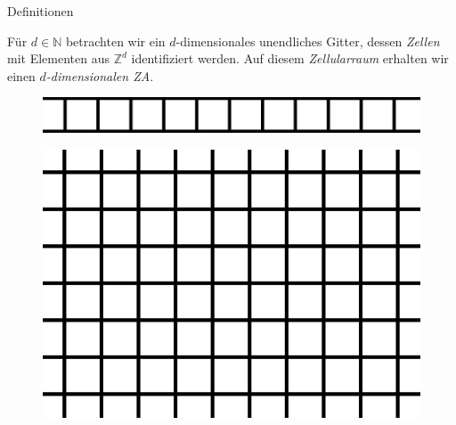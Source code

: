 \documentclass[aspectratio=169]{beamer}
\begin{document}
  \begin{frame}{Definitionen}
    \begin{definition*}[Zellularraum]
      Für $d \in \mathbb{N}$ betrachten wir ein $d$-dimensionales unendliches Gitter, dessen \textit{Zellen} mit Elementen aus $\mathbb{Z}^d$ identifiziert werden. Auf diesem \textit{Zellularraum} erhalten wir einen \textit{$d$-dimensionalen ZA}.
    \end{definition*}

    \begin{multicols*}{3}
      \begin{figure}[H]
          \centering
          \includegraphics[width = 0.4 \textheight]{1d_cellspace.png}
      \end{figure}
      \vfill\null
      \columnbreak

      \pause

      \begin{figure}[H]
          \centering
          \includegraphics[width = 0.35 \textheight]{2d_cellspace.png}
      \end{figure}
      \vfill\null
      \columnbreak

      \pause


\end{multicols*}
\end{frame}
\end{document}
